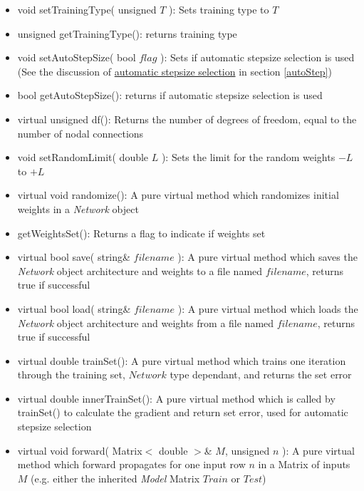 \documentclass{report}
\def\beginred{\color{red}}
\def\endcolor{\color{black}}
\begin{document}
\begin{itemize}
\begin{itemize}
\item void setTrainingType( unsigned $T$ ): Sets training type to $T$
\item unsigned getTrainingType(): returns training type
\item void setAutoStepSize( bool $flag$ ): Sets if automatic stepsize
      selection is used (See the discussion of
      \hyperref[autoStep]{automatic stepsize selection} in section
      \ref{autoStep})
\item bool getAutoStepSize(): returns if automatic stepsize selection
      is used
\item \beginred virtual unsigned df(): Returns the number of degrees
      of freedom, equal to the number of nodal connections \endcolor
\item void setRandomLimit( double $L$ ): Sets the limit for the random
      weights $-L$ to $+L$
\item \beginred virtual void randomize(): A pure virtual method which
      randomizes initial weights in a {\em Network} object \endcolor
\item getWeightsSet(): Returns a flag to indicate if weights set
\item \beginred virtual bool save( string\& $filename$ ): A pure
      virtual method which saves the {\em Network} object architecture
      and weights to a file named $filename$, returns true if
      successful \endcolor
\item \beginred virtual bool load( string\& $filename$ ): A pure
      virtual method which loads the {\em Network} object architecture
      and weights from a file named $filename$, returns true if
      successful \endcolor
\item \beginred virtual double trainSet(): A pure virtual method which
      trains one iteration through the training set, {\em $Network$}
      type dependant, and returns the set error \endcolor
\item \beginred virtual double innerTrainSet(): A pure virtual method
      which is called by trainSet() to calculate the gradient and
      return set error, used for automatic stepsize selection
      \endcolor
\item \beginred virtual void forward( Matrix$<$ double $>$\& $M$,
      unsigned $n$ ): A pure virtual method which forward propagates
      for one input row $n$ in a Matrix of inputs $M$ (e.g. either the
      inherited {\em Model} Matrix $Train$ or $Test$) \endcolor

\end{itemize}
\end{itemize}
\end{document}
